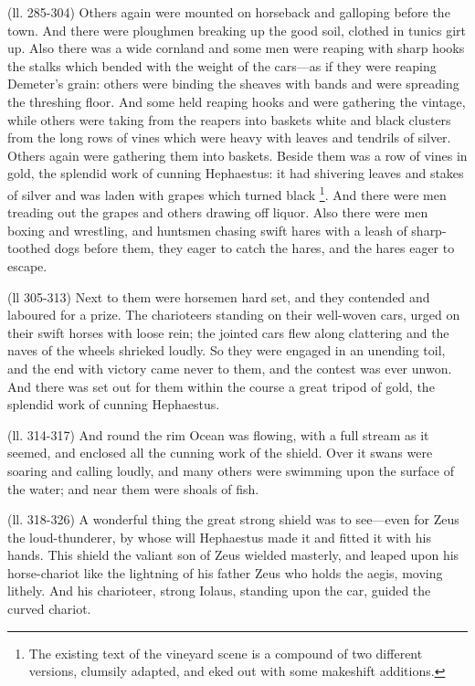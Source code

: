 (ll. 285-304) Others again were mounted on horseback and galloping before the
town. And there were ploughmen breaking up the good soil, clothed in tunics
girt up. Also there was a wide cornland and some men were reaping with sharp
hooks the stalks which bended with the weight of the cars—as if they were
reaping Demeter’s grain: others were binding the sheaves with bands and
were spreading the threshing floor. And some held reaping hooks and were
gathering the vintage, while others were taking from the reapers into baskets
white and black clusters from the long rows of vines which were heavy with
leaves and tendrils of silver. Others again were gathering them into baskets.
Beside them was a row of vines in gold, the splendid work of cunning
Hephaestus: it had shivering leaves and stakes of silver and was laden with
grapes which turned black \footnote{The existing text of the
vineyard scene is a compound of two different versions, clumsily adapted, and
eked out with some makeshift additions.}. And there were men treading out
the grapes and others drawing off liquor. Also there were men boxing and
wrestling, and huntsmen chasing swift hares with a leash of sharp-toothed dogs
before them, they eager to catch the hares, and the hares eager to escape.

(ll 305-313) Next to them were horsemen hard set, and they contended and
laboured for a prize. The charioteers standing on their well-woven cars, urged
on their swift horses with loose rein; the jointed cars flew along clattering
and the naves of the wheels shrieked loudly. So they were engaged in an
unending toil, and the end with victory came never to them, and the contest was
ever unwon. And there was set out for them within the course a great tripod of
gold, the splendid work of cunning Hephaestus.

(ll. 314-317) And round the rim Ocean was flowing, with a full stream as it
seemed, and enclosed all the cunning work of the shield. Over it swans were
soaring and calling loudly, and many others were swimming upon the surface of
the water; and near them were shoals of fish.

(ll. 318-326) A wonderful thing the great strong shield was to see—even
for Zeus the loud-thunderer, by whose will Hephaestus made it and fitted it
with his hands. This shield the valiant son of Zeus wielded masterly, and
leaped upon his horse-chariot like the lightning of his father Zeus who holds
the aegis, moving lithely. And his charioteer, strong Iolaus, standing upon the
car, guided the curved chariot.

